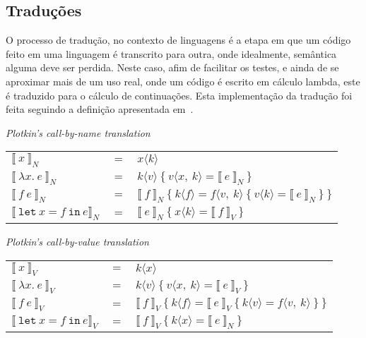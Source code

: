 \subsection{Traduções}\label{subsec:cps-translations}
O processo de tradução, no contexto de linguagens é a etapa em que um código feito em uma linguagem é transcrito para outra, onde idealmente, semântica alguma deve ser perdida.
Neste caso, afim de facilitar os testes, e ainda de se aproximar mais de um uso real, onde um código é escrito em cálculo lambda, este é traduzido para o cálculo de continuações.
Esta implementação da tradução foi feita seguindo a definição apresentada em~\cite{torrens2024operational}.

\phantom{Newline}

 \textit{Plotkin's call-by-name translation}

\begin{tabular}{lcl}
     ${\llbracket\ x\ \rrbracket}_N$ & $=$ & $x \langle k \rangle$ \\ 
     ${\llbracket\ \lambda x.\ e\ \rrbracket}_N$ & $=$ & $k \langle v \rangle\ \{\  v\langle x,\ k \rangle = {\llbracket\ e\ \rrbracket}_N \ \}$ \\
     ${\llbracket\ f\ e\ \rrbracket}_N$ & $=$ & ${\llbracket\ f\ \rrbracket}_N\ \{\  k\langle f \rangle = f \langle v,\ k \rangle\ \{\  v\langle k \rangle = {\llbracket\ e\ \rrbracket}_N \ \}\ \}$ \\
     ${\llbracket\ \mathtt{let}\ x = f\ \mathtt{in}\ e \rrbracket}_N$ & $=$ & ${\llbracket\ e\ \rrbracket}_N\ \{\  x\langle k \rangle =  {\llbracket\ f\ \rrbracket}_V \ \} $
\end{tabular}

\phantom{Newline}

 \textit{Plotkin's call-by-value translation}

\begin{tabular}{lcl}
     ${\llbracket\ x\ \rrbracket}_V$ & $=$ & $k \langle x \rangle$ \\ 
     ${\llbracket\ \lambda x.\ e\ \rrbracket}_V$ & $=$ & $k \langle v \rangle\ \{\  v\langle x,\ k \rangle = {\llbracket\ e\ \rrbracket}_V \ \}$ \\
     ${\llbracket\ f\ e\ \rrbracket}_V$ & $=$ & ${\llbracket\ f\ \rrbracket}_V\ \{\  k\langle f \rangle = {\llbracket\ e\ \rrbracket}_V\ \{\  k\langle v \rangle = f \langle v,\ k \rangle\ \}\ \}$ \\
     ${\llbracket\ \mathtt{let}\ x = f\ \mathtt{in}\ e \rrbracket}_V$ & $=$ & ${\llbracket\ f\ \rrbracket}_V\ \{\  k\langle x \rangle =  {\llbracket\ e\ \rrbracket}_N \ \} $
\end{tabular}

